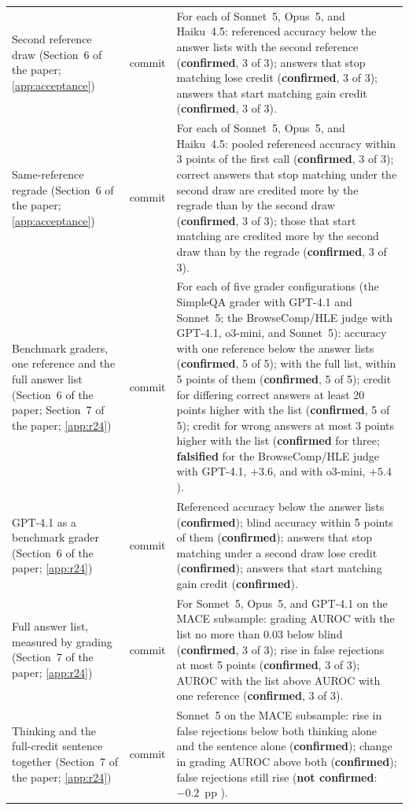 {\begin{longtable}{L{3.2cm}L{1.1cm}L{8.7cm}}
Second reference draw (Section~6 of the paper; \cref{app:acceptance}) & commit & For each of Sonnet~5, Opus~5, and Haiku~4.5: referenced accuracy below the answer lists with the second reference (\textbf{confirmed}, 3 of 3); answers that stop matching lose credit (\textbf{confirmed}, 3 of 3); answers that start matching gain credit (\textbf{confirmed}, 3 of 3). \\
Same-reference regrade (Section~6 of the paper; \cref{app:acceptance}) & commit & For each of Sonnet~5, Opus~5, and Haiku~4.5: pooled referenced accuracy within 3 points of the first call (\textbf{confirmed}, 3 of 3); correct answers that stop matching under the second draw are credited more by the regrade than by the second draw (\textbf{confirmed}, 3 of 3); those that start matching are credited more by the second draw than by the regrade (\textbf{confirmed}, 3 of 3). \\
Benchmark graders, one reference and the full answer list (Section~6 of the paper; Section~7 of the paper; \cref{app:r24}) & commit & For each of five grader configurations (the SimpleQA grader with GPT-4.1 and Sonnet~5; the BrowseComp/HLE judge with GPT-4.1, o3-mini, and Sonnet~5): accuracy with one reference below the answer lists (\textbf{confirmed}, 5 of 5); with the full list, within 5 points of them (\textbf{confirmed}, 5 of 5); credit for differing correct answers at least 20 points higher with the list (\textbf{confirmed}, 5 of 5); credit for wrong answers at most 3 points higher with the list (\textbf{confirmed} for three; \textbf{falsified} for the BrowseComp/HLE judge with GPT-4.1, $+3.6$, and with o3-mini, $+5.4$). \\
GPT-4.1 as a benchmark grader (Section~6 of the paper; \cref{app:r24}) & commit & Referenced accuracy below the answer lists (\textbf{confirmed}); blind accuracy within 5 points of them (\textbf{confirmed}); answers that stop matching under a second draw lose credit (\textbf{confirmed}); answers that start matching gain credit (\textbf{confirmed}). \\
Full answer list, measured by grading (Section~7 of the paper; \cref{app:r24}) & commit & For Sonnet~5, Opus~5, and GPT-4.1 on the \textsc{MACE} subsample: grading AUROC with the list no more than 0.03 below blind (\textbf{confirmed}, 3 of 3); rise in false rejections at most 5 points (\textbf{confirmed}, 3 of 3); AUROC with the list above AUROC with one reference (\textbf{confirmed}, 3 of 3). \\
Thinking and the full-credit sentence together (Section~7 of the paper; \cref{app:r24}) & commit & Sonnet~5 on the \textsc{MACE} subsample: rise in false rejections below both thinking alone and the sentence alone (\textbf{confirmed}); change in grading AUROC above both (\textbf{confirmed}); false rejections still rise (\textbf{not confirmed}: $-0.2$~pp ). \\

\end{longtable}}
